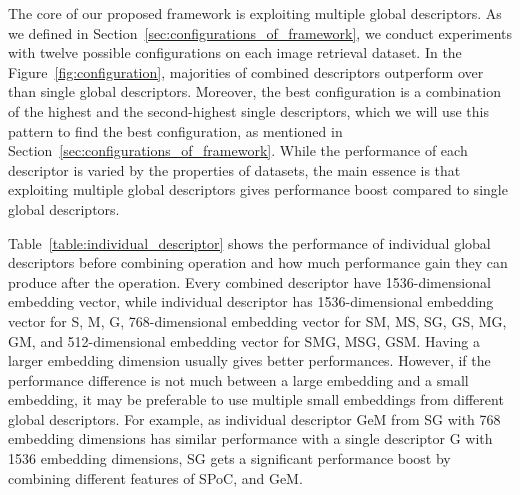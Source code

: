 \documentclass[10pt,twocolumn,letterpaper]{article}
\begin{document}
\begin{CJK}{UTF8}{mj}
The core of our proposed framework is exploiting multiple global descriptors.
As we defined in Section~\ref{sec:configurations_of_framework}, we conduct experiments with twelve possible configurations on each image retrieval dataset.
In the Figure~\ref{fig:configuration}, majorities of combined descriptors outperform over than single global descriptors.
Moreover, the best configuration is a combination of the highest and the second-highest single descriptors, which we will use this pattern to find the best configuration, as mentioned in Section~\ref{sec:configurations_of_framework}.
While the performance of each descriptor is varied by the properties of datasets, the main essence is that exploiting multiple global descriptors gives performance boost compared to single global descriptors.

Table~\ref{table:individual_descriptor} shows the performance of individual global descriptors before combining operation and how much performance gain they can produce after the operation.
Every combined descriptor have 1536-dimensional embedding vector, while individual descriptor has 1536-dimensional embedding vector for S, M, G, 768-dimensional embedding vector for SM, MS, SG, GS, MG, GM, and 512-dimensional embedding vector for SMG, MSG, GSM.
Having a larger embedding dimension usually gives better performances.
However, if the performance difference is not much between a large embedding and a small embedding, it may be preferable to use multiple small embeddings from different global descriptors.
For example, as individual descriptor GeM from SG with 768 embedding dimensions has similar performance with a single descriptor G with 1536 embedding dimensions, SG gets a significant performance boost by combining different features of SPoC, and GeM.



\end{CJK}
\end{document}
